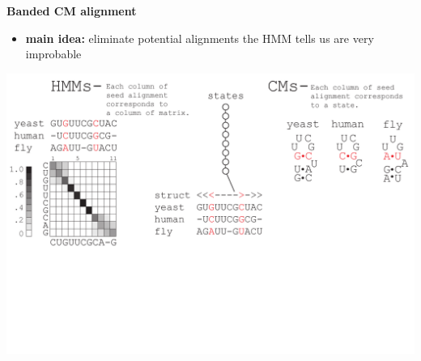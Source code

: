\documentclass[landscape]{slides}
\begin{document}
\begin{slide}
\begin{center}
\large
\textbf{Banded CM alignment}
\end{center}
\medskip
\small
\begin{itemize}
\item
\textbf{main idea:} eliminate potential alignments the HMM tells us are very improbable
\end{itemize}
\begin{center}
\includegraphics[width=8in]{figs/post_hmm_to_cm_map2_layer3}
\end{center}
\vfill
\end{slide}
\end{document}
